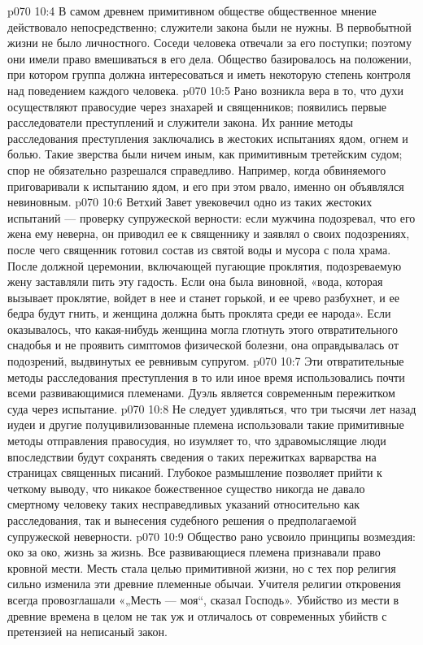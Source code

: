 \vs p070 10:4 \pc В самом древнем примитивном обществе общественное мнение действовало непосредственно; служители закона были не нужны. В первобытной жизни не было личностного. Соседи человека отвечали за его поступки; поэтому они имели право вмешиваться в его дела. Общество базировалось на положении, при котором группа должна интересоваться и иметь некоторую степень контроля над поведением каждого человека.
\vs p070 10:5 Рано возникла вера в то, что духи осуществляют правосудие через знахарей и священников; появились первые расследователи преступлений и служители закона. Их ранние методы расследования преступления заключались в жестоких испытаниях ядом, огнем и болью. Такие зверства были ничем иным, как примитивным третейским судом; спор не обязательно разрешался справедливо. Например, когда обвиняемого приговаривали к испытанию ядом, и его при этом рвало, именно он объявлялся невиновным.
\vs p070 10:6 Ветхий Завет увековечил одно из таких жестоких испытаний --- проверку супружеской верности: если мужчина подозревал, что его жена ему неверна, он приводил ее к священнику и заявлял о своих подозрениях, после чего священник готовил состав из святой воды и мусора с пола храма. После должной церемонии, включающей пугающие проклятия, подозреваемую жену заставляли пить эту гадость. Если она была виновной, «вода, которая вызывает проклятие, войдет в нее и станет горькой, и ее чрево разбухнет, и ее бедра будут гнить, и женщина должна быть проклята среди ее народа». Если оказывалось, что какая\hyp{}нибудь женщина могла глотнуть этого отвратительного снадобья и не проявить симптомов физической болезни, она оправдывалась от подозрений, выдвинутых ее ревнивым супругом.
\vs p070 10:7 Эти отвратительные методы расследования преступления в то или иное время использовались почти всеми развивающимися племенами. Дуэль является современным пережитком суда через испытание.
\vs p070 10:8 Не следует удивляться, что три тысячи лет назад иудеи и другие полуцивилизованные племена использовали такие примитивные методы отправления правосудия, но изумляет то, что здравомыслящие люди впоследствии будут сохранять сведения о таких пережитках варварства на страницах священных писаний. Глубокое размышление позволяет прийти к четкому выводу, что никакое божественное существо никогда не давало смертному человеку таких несправедливых указаний относительно как расследования, так и вынесения судебного решения о предполагаемой супружеской неверности.
\vs p070 10:9 \pc Общество рано усвоило принципы возмездия: око за око, жизнь за жизнь. Все развивающиеся племена признавали право кровной мести. Месть стала целью примитивной жизни, но с тех пор религия сильно изменила эти древние племенные обычаи. Учителя религии откровения всегда провозглашали «„Месть --- моя“, сказал Господь». Убийство из мести в древние времена в целом не так уж и отличалось от современных убийств с претензией на неписаный закон.
